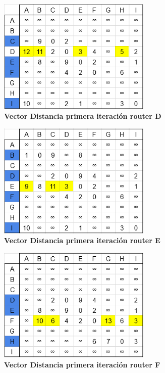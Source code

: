\documentclass[12pt]{article}
\begin{document}
\begin{figure}[H] 
\centering 
\includegraphics[width=0.65\textwidth]{imagenes/2D1.png} \caption{\small \textbf{Vector Distancia primera iteración router D}}
\label{fig:diagrama_20} 
\end{figure}
\begin{figure}[H] 
\centering 
\includegraphics[width=0.65\textwidth]{imagenes/2E1.png} \caption{\small \textbf{Vector Distancia primera iteración router E}}
\label{fig:diagrama_21} 
\end{figure}
\begin{figure}[H] 
\centering 
\includegraphics[width=0.65\textwidth]{imagenes/2F1.png} \caption{\small \textbf{Vector Distancia primera iteración router F}}
\label{fig:diagrama_22} 
\end{figure}
\end{document}
